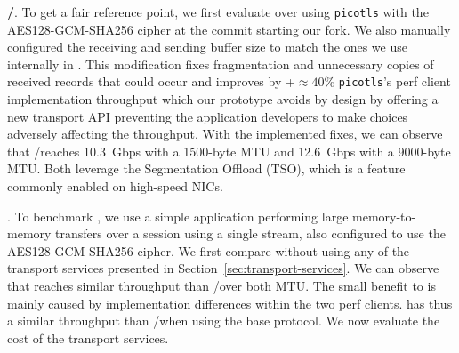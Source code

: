 \textbf{\tcp/\tls}. To get a fair reference point, we first evaluate \tls over 
\tcp using \texttt{picotls} with the AES128-GCM-SHA256 cipher at the commit 
starting our fork. We also manually configured the receiving and sending buffer size 
to match the ones we use internally in \tcpls. This modification fixes fragmentation and 
unnecessary copies of received \tls records that could occur and improves by
+$\approx 40\%$ \texttt{picotls}'s perf client
implementation throughput which our \tcpls 
prototype avoids by design by offering a new transport API preventing the
application developers to make choices adversely affecting the throughput. With
the implemented fixes, we can observe that \tcp/\tls reaches 10.3~Gbps 
with a 1500-byte MTU and 12.6~Gbps with a 9000-byte MTU. Both leverage the 
\tcp Segmentation Offload (TSO), which is a feature commonly enabled on 
high-speed NICs.

\textbf{\tcpls}.
To benchmark \tcpls, we use a simple application performing large 
memory-to-memory transfers over a \tcpls session using a single stream, also
configured to use the AES128-GCM-SHA256 cipher. 
We first compare \tcpls without using any of the transport services 
presented in Section~\ref{sec:transport-services}. We can observe that 
\tcpls reaches similar throughput than \tls/\tcp over both 
MTU. The small benefit to \tcpls is mainly caused by implementation differences
within the two perf clients. \tcpls has thus a similar throughput than \tcp/\tls when using the base 
protocol. We now evaluate the cost of the transport services.


